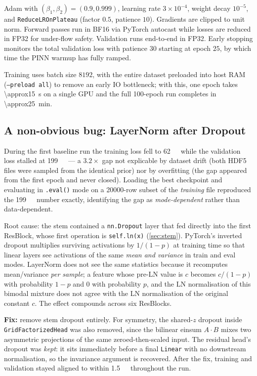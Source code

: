 \documentclass[11pt,a4paper]{article}
\newcommand{\bps}{\,\text{bps}}
\begin{document}
Adam with $(\beta_1,\beta_2)=(0.9,0.999)$, learning rate
$3\times10^{-4}$, weight decay $10^{-5}$, and \texttt{ReduceLROnPlateau}
(factor $0.5$, patience $10$). Gradients are clipped to unit norm.
Forward passes run in BF16 via PyTorch autocast while losses are
reduced in FP32 for under-flow safety. Validation runs end-to-end in
FP32. Early stopping monitors the total validation loss with
patience $30$ starting at epoch $25$, by which time the PINN
warmup has fully ramped.

Training uses batch size $8192$, with the entire dataset preloaded
into host RAM (\texttt{--preload all}) to remove an early IO
bottleneck; with this, one epoch takes \SI{\approx15}{s} on a
single GPU and the full \num{100}-epoch run completes in
\SI{\approx25}{\minute}.

\subsection{A non-obvious bug: LayerNorm after Dropout}
\label{sec:ln-dropout-bug}

During the first baseline run the training loss fell to \SI{62}{\bps}
while the validation loss stalled at \SI{199}{\bps} --- a $3.2\times$
gap not explicable by dataset drift (both HDF5 files were sampled
from the identical prior) nor by overfitting (the gap appeared from
the first epoch and never closed). Loading the best checkpoint and
evaluating in \texttt{.eval()} mode on a \num{20000}-row subset of
the \emph{training} file reproduced the \SI{199}{\bps} number
exactly, identifying the gap as \emph{mode-dependent} rather than
data-dependent.

Root cause: the stem contained a \texttt{nn.Dropout} layer that fed
directly into the first ResBlock, whose first operation is
\texttt{self.ln(x)} (\cref{sec:stem}). PyTorch's inverted dropout
multiplies surviving activations by $1/(1-p)$ at training time so that
linear layers see activations of the same \emph{mean and variance} in
train and eval modes. LayerNorm does not see the same statistics
because it recomputes mean/variance \emph{per sample}; a feature whose
pre-LN value is $c$ becomes $c/(1-p)$ with probability $1-p$ and $0$
with probability $p$, and the LN normalisation of this bimodal mixture
does not agree with the LN normalisation of the original constant
$c$. The effect compounds across six ResBlocks.

\textbf{Fix:} remove stem dropout entirely. For symmetry, the shared-$z$
dropout inside \texttt{GridFactorizedHead} was also removed, since the
bilinear einsum $A\cdot B$ mixes two asymmetric projections of the same
zeroed-then-scaled input. The residual head's dropout was
\emph{kept}: it sits immediately before a final \texttt{Linear} with no
downstream normalisation, so the invariance argument is recovered.
After the fix, training and validation stayed aligned to within
\SI{1.5}{\bps} throughout the run.
\end{document}
